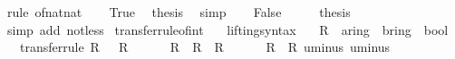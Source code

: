 \begin{isabellebody}
\ {\isacharparenleft}{\kern0pt}rule\ of{\isacharunderscore}{\kern0pt}nat{\isacharunderscore}{\kern0pt}nat{\isacharparenright}{\kern0pt}\isanewline
\ \ \isamarkupfalse%
\ True\ \isamarkupfalse%
\ {\isacharquery}{\kern0pt}thesis\ \isamarkupfalse%
\ simp\isanewline
{}\isamarkupfalse%
\isanewline
\ \ \isamarkupfalse%
\ False\isanewline
\ \ \isamarkupfalse%
\ \isamarkupfalse%
\ {\isacharquery}{\kern0pt}thesis\ \isamarkupfalse%
\ {\isacharparenleft}{\kern0pt}simp\ add{\isacharcolon}{\kern0pt}\ not{\isacharunderscore}{\kern0pt}less{\isacharparenright}{\kern0pt}\isanewline
{}\isamarkupfalse%
%
\endisatagproof
{\isafoldproof}%
%
\isadelimproof
\isanewline
%
\endisadelimproof
\isanewline
{}\isamarkupfalse%
\isanewline
\isanewline
{}\isamarkupfalse%
\ transfer{\isacharunderscore}{\kern0pt}rule{\isacharunderscore}{\kern0pt}of{\isacharunderscore}{\kern0pt}int{\isacharcolon}{\kern0pt}\isanewline
\ \ \ lifting{\isacharunderscore}{\kern0pt}syntax\isanewline
\ \ \ R\ {\isacharcolon}{\kern0pt}{\isacharcolon}{\kern0pt}\ {\isachardoublequoteopen}{\isacharprime}{\kern0pt}a{\isacharcolon}{\kern0pt}{\isacharcolon}{\kern0pt}ring{\isacharunderscore}{\kern0pt}{}\ {\isasymRightarrow}\ {\isacharprime}{\kern0pt}b{\isacharcolon}{\kern0pt}{\isacharcolon}{\kern0pt}ring{\isacharunderscore}{\kern0pt}{}\ {\isasymRightarrow}\ bool{\isachardoublequoteclose}\isanewline
\ \ \ {\isacharbrackleft}{\kern0pt}transfer{\isacharunderscore}{\kern0pt}rule{\isacharbrackright}{\kern0pt}{\isacharcolon}{\kern0pt}\ {\isachardoublequoteopen}R\ {}\ {}{\isachardoublequoteclose}\ {\isachardoublequoteopen}R\ {}\ {}{\isachardoublequoteclose}\isanewline
\ \ \ \ {\isachardoublequoteopen}{\isacharparenleft}{\kern0pt}R\ {\isacharequal}{\kern0pt}{\isacharequal}{\kern0pt}{\isacharequal}{\kern0pt}{\isachargreater}{\kern0pt}\ R\ {\isacharequal}{\kern0pt}{\isacharequal}{\kern0pt}{\isacharequal}{\kern0pt}{\isachargreater}{\kern0pt}\ R{\isacharparenright}{\kern0pt}\ {\isacharparenleft}{\kern0pt}{\isacharplus}{\kern0pt}{\isacharparenright}{\kern0pt}\ {\isacharparenleft}{\kern0pt}{\isacharplus}{\kern0pt}{\isacharparenright}{\kern0pt}{\isachardoublequoteclose}\isanewline
\ \ \ \ {\isachardoublequoteopen}{\isacharparenleft}{\kern0pt}R\ {\isacharequal}{\kern0pt}{\isacharequal}{\kern0pt}{\isacharequal}{\kern0pt}{\isachargreater}{\kern0pt}\ R{\isacharparenright}{\kern0pt}\ uminus\ uminus{\isachardoublequoteclose}\isanewline

\end{isabellebody}

